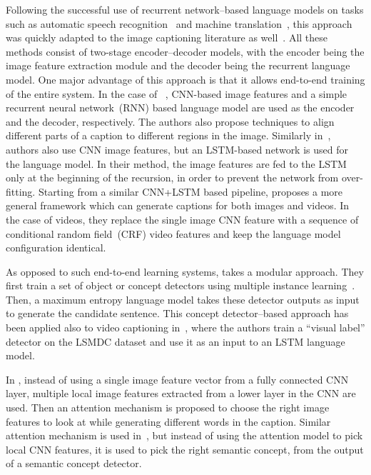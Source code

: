 Following the successful use of recurrent network--based language models on
tasks such as automatic speech recognition~\cite{mikolov2010recurrent} and
machine translation~\cite{bahdanau2014neural}, this approach was quickly adapted
to the image captioning literature as well~\cite{Karpathy_2015_CVPR,
Vinyals_2015_CVPR, donahue2015long}.
All these methods consist of two-stage encoder--decoder models, with the encoder
being the image feature extraction module and the decoder being the recurrent
language model.
One major advantage of this approach is that it allows end-to-end training of the
entire system.
In the case of ~\cite{Karpathy_2015_CVPR}, CNN-based image features and a simple
recurrent neural network~(RNN) based language model are used as the encoder and
the decoder, respectively.
The authors also propose techniques to align different parts of a caption to
different regions in the image. 
Similarly in~\cite{Vinyals_2015_CVPR}, authors also use CNN image features, but
an LSTM-based network is used for the language model.
In their method, the image features are fed to the LSTM only at the beginning of
the recursion, in order to prevent the network from over-fitting.
Starting from a similar CNN+LSTM based pipeline,\cite{donahue2015long} proposes
a more general framework which can generate captions for both images and videos.
In the case of videos, they replace the single image CNN feature with a sequence
of conditional random field~(CRF) video features and keep the language model
configuration identical.

As opposed to such end-to-end learning systems, \cite{Fang2015} takes a modular
approach. 
They first train a set of object or concept detectors using multiple instance
learning~\cite{maron1998framework}.
Then, a maximum entropy language model takes these detector outputs as input to
generate the candidate sentence.
This concept detector--based approach has been applied also to video captioning
in~\cite{DBLP:journals/corr/RohrbachTRTPLCS16}, where the authors train a
``visual label'' detector on the LSMDC dataset and use it as an input to an LSTM
language model.

In \cite{Xu2015show}, instead of using a single image feature vector from a
fully connected CNN layer, multiple local image features extracted from a lower
layer in the CNN are used.
Then an attention mechanism is proposed to choose the right image features to
look at while generating different words in the caption.
Similar attention mechanism is used in~\cite{you2016image}, but instead of using
the attention model to pick local CNN features, it is used to pick the right
semantic concept, from the output of a semantic concept detector.

